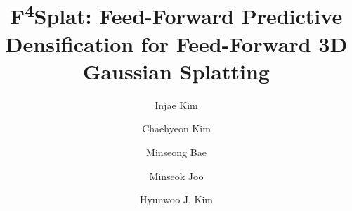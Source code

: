\documentclass[runningheads]{llncs}
\begin{document}
\title{\texorpdfstring{F\textsuperscript{4}Splat: Feed-Forward Predictive Densification for Feed-Forward 3D Gaussian Splatting}{F4Splat: Feed-Forward Predictive Densification for Feed-Forward 3D Gaussian Splatting}}


\author{Injae Kim \and
Chaehyeon Kim \and
Minseong Bae \and
Minseok Joo \and
Hyunwoo J. Kim}




\maketitle









\end{document}
